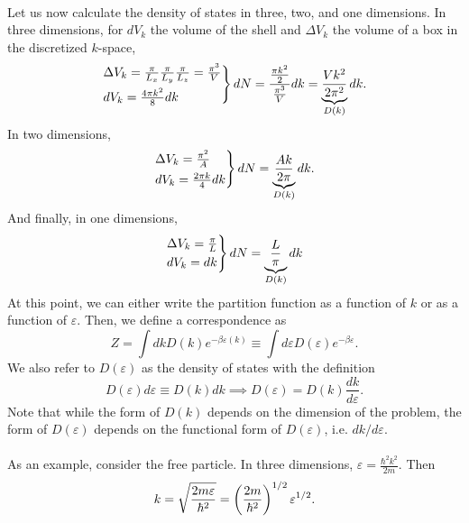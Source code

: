 \\
Let us now calculate the density of states in three, two, and one dimensions. In three dimensions, for $dV_k$ the volume of the shell and $\Delta V_k$ the volume of a box in the discretized $k$-space,
\begin{equation}
    \begin{rcases}
        \Delta V_k = \frac{\pi}{L_x}\frac{\pi}{L_y}\frac{\pi}{L_z}=\frac{\pi^3}{V}\\
        dV_k = \frac{4\pi k^2}{8}dk
    \end{rcases}dN = \frac{\frac{\pi k^2}{2}}{\frac{\pi^3}{V}}dk = \underbrace{\frac{Vk^2}{2\pi^2}}_{D(k)}dk.
\end{equation}
In two dimensions,
\begin{equation}
    \begin{rcases}
        \Delta V_k = \frac{\pi^2}{A}\\ 
        dV_k = \frac{2\pi k}{4}dk
    \end{rcases}dN = \underbrace{\frac{Ak}{2\pi}}_{D(k)}dk.
\end{equation}
And finally, in one dimensions,
\begin{equation}
    \begin{rcases}
        \Delta V_k = \frac{\pi}{L} \\ dV_k = dk
    \end{rcases}dN=\underbrace{\frac{L}{\pi}}_{D(k)}dk
\end{equation}
At this point, we can either write the partition function as a function of $k$ or as a function of $\varepsilon$. Then, we define a correspondence as
\begin{equation}
    Z = \int dk D(k)e^{-\beta\varepsilon(k)}\equiv \int d\varepsilon D(\varepsilon)e^{-\beta\varepsilon}.
\end{equation}
We also refer to $D(\varepsilon)$ as the density of states with the definition
\begin{equation}
    D(\varepsilon)d\varepsilon \equiv D(k)dk \implies D(\varepsilon)=D(k)\frac{dk}{d\varepsilon}.
\end{equation}
Note that while the form of $D(k)$ depends on the dimension of the problem, the form of $D(\varepsilon)$ depends on the functional form of $D(\varepsilon)$, i.e. $dk/d\varepsilon$.\\
\\
As an example, consider the free particle. In three dimensions, $\varepsilon=\frac{\hbar^2k^2}{2m}$. Then
\begin{equation}
    k = \sqrt{\frac{2m\varepsilon}{\hbar^2}} = \left( \frac{2m}{\hbar^2} \right)^{1/2}\varepsilon^{1/2}.
\end{equation}
